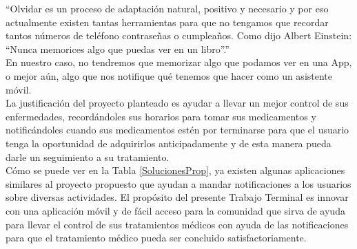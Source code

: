 “Olvidar es un proceso de adaptación natural, positivo y necesario y por eso actualmente existen tantas herramientas para que no tengamos que recordar tantos números de teléfono contraseñas o cumpleaños. Como dijo Albert Einstein: “Nunca memorices algo que puedas ver en un libro”.”\cite{Referencia23}\\
En nuestro caso, no tendremos que memorizar algo que podamos ver en una App, o mejor aún, algo que nos notifique qué tenemos que hacer como un asistente móvil.\\
La justificación del proyecto planteado es ayudar a llevar un mejor control de sus enfermedades, recordándoles sus horarios para tomar sus medicamentos y notificándoles cuando sus medicamentos estén por terminarse para que el
usuario tenga la oportunidad de adquirirlos anticipadamente y de esta manera pueda darle un seguimiento a su tratamiento.\\
Cómo se puede ver en la Tabla \ref{SolucionesProp}, ya existen algunas aplicaciones similares al proyecto propuesto que ayudan a mandar notificaciones a los usuarios sobre diversas actividades. El propósito
del presente Trabajo Terminal es innovar con una aplicación móvil y de fácil acceso para la comunidad que sirva de ayuda para llevar el control de sus tratamientos médicos con ayuda de las notificaciones para que el tratamiento médico pueda ser concluido satisfactoriamente.
	
